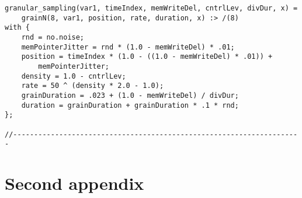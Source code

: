 \begin{lstlisting}
granular_sampling(var1, timeIndex, memWriteDel, cntrlLev, divDur, x) = 
    grainN(8, var1, position, rate, duration, x) :> /(8)
with {
    rnd = no.noise;
    memPointerJitter = rnd * (1.0 - memWriteDel) * .01;
    position = timeIndex * (1.0 - ((1.0 - memWriteDel) * .01)) + 
        memPointerJitter;
    density = 1.0 - cntrlLev;
    rate = 50 ^ (density * 2.0 - 1.0);
    grainDuration = .023 + (1.0 - memWriteDel) / divDur;
    duration = grainDuration + grainDuration * .1 * rnd;
};

//---------------------------------------------------------------------
\end{lstlisting}

\clearpage
\section{Second appendix}